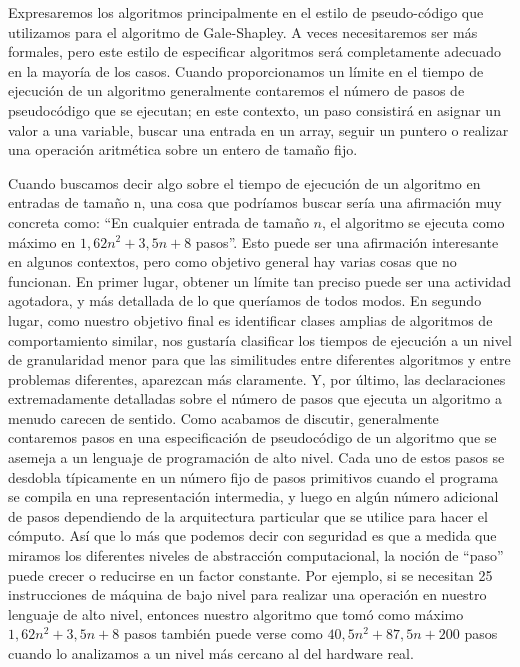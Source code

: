 \documentclass[a4paper, 12pt]{book}
\theoremstyle{dotless}
\begin{document}
Expresaremos los algoritmos principalmente en el estilo de pseudo-código que utilizamos para el algoritmo de Gale-Shapley. A veces necesitaremos ser más formales, pero este estilo de especificar algoritmos será completamente adecuado en la mayoría de los casos. Cuando proporcionamos un límite en el tiempo de ejecución de un algoritmo generalmente contaremos el número de pasos de pseudocódigo que se ejecutan; en este contexto, un paso consistirá en asignar un valor a una
variable, buscar una entrada en un array, seguir un puntero o realizar una operación aritmética sobre un entero de tamaño fijo.

Cuando buscamos decir algo sobre el tiempo de ejecución de un algoritmo en entradas de tamaño n, una cosa que podríamos buscar sería una afirmación muy concreta como: ``En cualquier entrada de tamaño $n$, el algoritmo se ejecuta como máximo en $1,62n^2 +3,5n + 8$ pasos''. Esto puede ser una afirmación interesante en algunos contextos, pero como objetivo general hay varias cosas que no funcionan. 
En primer lugar, obtener un límite tan preciso puede ser una actividad agotadora, y más detallada de lo que queríamos de todos modos.
En segundo lugar, como nuestro objetivo final es identificar clases amplias de algoritmos de
comportamiento similar, nos gustaría clasificar los tiempos de ejecución a un nivel de granularidad menor para que las similitudes entre diferentes algoritmos y entre
problemas diferentes, aparezcan más claramente. Y, por último, las declaraciones extremadamente detalladas sobre el número de pasos que ejecuta un algoritmo a menudo carecen de sentido. Como acabamos de discutir, generalmente contaremos pasos en una especificación de pseudocódigo de un algoritmo que se asemeja a un lenguaje de programación de alto nivel. Cada uno de estos pasos se desdobla típicamente en un número fijo de pasos primitivos cuando el programa se compila en una representación intermedia, y luego en algún número adicional de pasos dependiendo de la arquitectura particular que se utilice para hacer el cómputo. Así que lo más que podemos decir con seguridad es que a medida que miramos los diferentes niveles de abstracción computacional, la noción de ``paso'' puede crecer o reducirse en un factor constante.
Por ejemplo, si se necesitan 25 instrucciones de máquina de bajo nivel para realizar una operación en nuestro lenguaje de alto nivel, entonces nuestro algoritmo que tomó como máximo $1,62n^2 +3,5n + 8$ pasos también puede verse como $40,5n^2 + 87,5n + 200$ pasos cuando lo analizamos a un nivel más cercano al del hardware real.
\end{document}
